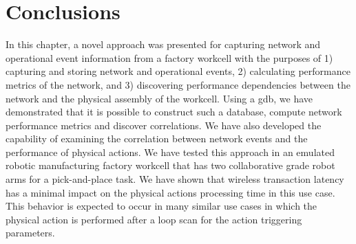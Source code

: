 \section{Conclusions} \label{gdbappl:sec::conclusion}
In this chapter, a novel approach was presented for capturing network and operational event information from a factory workcell with the  purposes of 1) capturing and storing network and operational events, 2) calculating performance metrics of the network, and 3) discovering performance dependencies between the network and the physical assembly of the workcell. Using a \gls{gdb}, we have demonstrated that it is possible to construct such a database, compute network performance metrics and discover correlations. We have also developed the capability of examining the correlation between network events and the performance of physical actions. We have tested this approach in an emulated robotic manufacturing factory workcell that has two collaborative grade robot arms for a pick-and-place task. We have shown that wireless transaction latency has a minimal impact on the physical actions processing time in this use case. This behavior is expected to occur in many similar use cases in which the physical action is performed after a loop scan for the action triggering parameters. 


